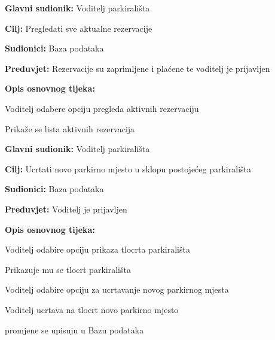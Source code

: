 \noindent {}
\begin{packed_item}

\item \textbf{Glavni sudionik: }Voditelj parkirališta
\item  \textbf{Cilj:} Pregledati sve aktualne rezervacije
\item  \textbf{Sudionici:} Baza podataka
\item  \textbf{Preduvjet:} Rezervacije su zaprimljene i plaćene te voditelj je prijavljen
\item  \textbf{Opis osnovnog tijeka:}

\item[] \begin{packed_enum}
	
	\item Voditelj odabere opciju pregleda aktivnih rezervaciju
	\item Prikaže se lista aktivnih rezervacija
	
\end{packed_enum}
\end{packed_item}

\noindent {}
\begin{packed_item}

\item \textbf{Glavni sudionik: }Voditelj parkirališta
\item  \textbf{Cilj:} Ucrtati novo parkirno mjesto u sklopu postojećeg parkirališta
\item  \textbf{Sudionici:} Baza podataka
\item  \textbf{Preduvjet:} Voditelj je prijavljen
\item  \textbf{Opis osnovnog tijeka:}

\item[] \begin{packed_enum}
	
	\item Voditelj odabire opciju prikaza tlocrta parkirališta
	\item Prikazuje mu se tlocrt parkirališta
	\item Voditelj odabire opciju za ucrtavanje novog parkirnog mjesta
	\item Voditelj ucrtava na tlocrt novo parkirno mjesto
	\item promjene se upisuju u Bazu podataka
	
\end{packed_enum}
\end{packed_item}

